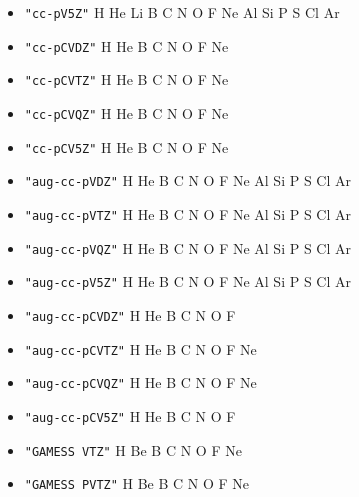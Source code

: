 \begin{itemize}
\item \verb#"cc-pV5Z"# \newline
 H He Li B C N O F Ne Al Si P S Cl Ar

\item \verb#"cc-pCVDZ"# \newline
 H He B C N O F Ne

\item \verb#"cc-pCVTZ"# \newline
 H He B C N O F Ne

\item \verb#"cc-pCVQZ"# \newline
 H He B C N O F Ne

\item \verb#"cc-pCV5Z"# \newline
 H He B C N O F Ne

\item \verb#"aug-cc-pVDZ"# \newline
 H He B C N O F Ne Al Si P S Cl Ar

\item \verb#"aug-cc-pVTZ"# \newline
 H He B C N O F Ne Al Si P S Cl Ar

\item \verb#"aug-cc-pVQZ"# \newline
 H He B C N O F Ne Al Si P S Cl Ar

\item \verb#"aug-cc-pV5Z"# \newline
 H He B C N O F Ne Al Si P S Cl Ar

\item \verb#"aug-cc-pCVDZ"# \newline
 H He B C N O F

\item \verb#"aug-cc-pCVTZ"# \newline
 H He B C N O F Ne

\item \verb#"aug-cc-pCVQZ"# \newline
 H He B C N O F Ne

\item \verb#"aug-cc-pCV5Z"# \newline
 H He B C N O F

\item \verb#"GAMESS VTZ"# \newline
 H Be B C N O F Ne

\item \verb#"GAMESS PVTZ"# \newline
 H Be B C N O F Ne


\end{itemize}
